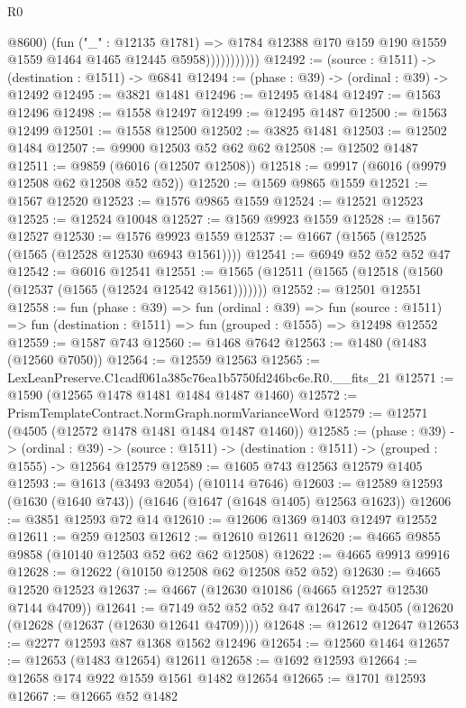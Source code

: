 \begin{lexlean}{R0}
\begin{coremodule}
                          @8600)
                        (fun ("_" : @12135 @1781) =>
                        @1784 @12388 @170 @159 @190 @1559 @1559 @1464 @1465 @12445 @5958)))))))))))
@12492 := (source : @1511) -> (destination : @1511) -> @6841
@12494 := (phase : @39) -> (ordinal : @39) -> @12492
@12495 := @3821 @1481
@12496 := @12495 @1484
@12497 := @1563 @12496
@12498 := @1558 @12497
@12499 := @12495 @1487
@12500 := @1563 @12499
@12501 := @1558 @12500
@12502 := @3825 @1481
@12503 := @12502 @1484
@12507 := @9900 @12503 @52 @62 @62
@12508 := @12502 @1487
@12511 := @9859 (@6016 (@12507 @12508))
@12518 := @9917 (@6016 (@9979 @12508 @62 @12508 @52 @52))
@12520 := @1569 @9865 @1559
@12521 := @1567 @12520
@12523 := @1576 @9865 @1559
@12524 := @12521 @12523
@12525 := @12524 @10048
@12527 := @1569 @9923 @1559
@12528 := @1567 @12527
@12530 := @1576 @9923 @1559
@12537 := @1667 (@1565 (@12525 (@1565 (@12528 @12530 @6943 @1561))))
@12541 := @6949 @52 @52 @52 @47
@12542 := @6016 @12541
@12551 := @1565 (@12511 (@1565 (@12518 (@1560 (@12537 (@1565 (@12524 @12542 @1561)))))))
@12552 := @12501 @12551
@12558 := fun (phase : @39) =>
  fun (ordinal : @39) =>
  fun (source : @1511) => fun (destination : @1511) => fun (grouped : @1555) => @12498 @12552
@12559 := @1587 @743
@12560 := @1468 @7642
@12563 := @1480 (@1483 (@12560 @7050))
@12564 := @12559 @12563
@12565 := LexLeanPreserve.C1cadf061a385c76ea1b5750fd246bc6e.R0.__fits_21
@12571 := @1590 (@12565 @1478 @1481 @1484 @1487 @1460)
@12572 := PrismTemplateContract.NormGraph.normVarianceWord
@12579 := @12571 (@4505 (@12572 @1478 @1481 @1484 @1487 @1460))
@12585 := (phase : @39) ->
  (ordinal : @39) -> (source : @1511) -> (destination : @1511) -> (grouped : @1555) -> @12564 @12579
@12589 := @1605 @743 @12563 @12579 @1405
@12593 := @1613 (@3493 @2054) (@10114 @7646)
@12603 := @12589 @12593 (@1630 (@1640 @743)) (@1646 (@1647 (@1648 @1405) @12563 @1623))
@12606 := @3851 @12593 @72 @14
@12610 := @12606 @1369 @1403 @12497 @12552
@12611 := @259 @12503
@12612 := @12610 @12611
@12620 := @4665 @9855 @9858 (@10140 @12503 @52 @62 @62 @12508)
@12622 := @4665 @9913 @9916
@12628 := @12622 (@10150 @12508 @62 @12508 @52 @52)
@12630 := @4665 @12520 @12523
@12637 := @4667 (@12630 @10186 (@4665 @12527 @12530 @7144 @4709))
@12641 := @7149 @52 @52 @52 @47
@12647 := @4505 (@12620 (@12628 (@12637 (@12630 @12641 @4709))))
@12648 := @12612 @12647
@12653 := @2277 @12593 @87 @1368 @1562 @12496
@12654 := @12560 @1464
@12657 := @12653 (@1483 @12654) @12611
@12658 := @1692 @12593
@12664 := @12658 @174 @922 @1559 @1561 @1482 @12654
@12665 := @1701 @12593
@12667 := @12665 @52 @1482

\end{coremodule}
\end{lexlean}
